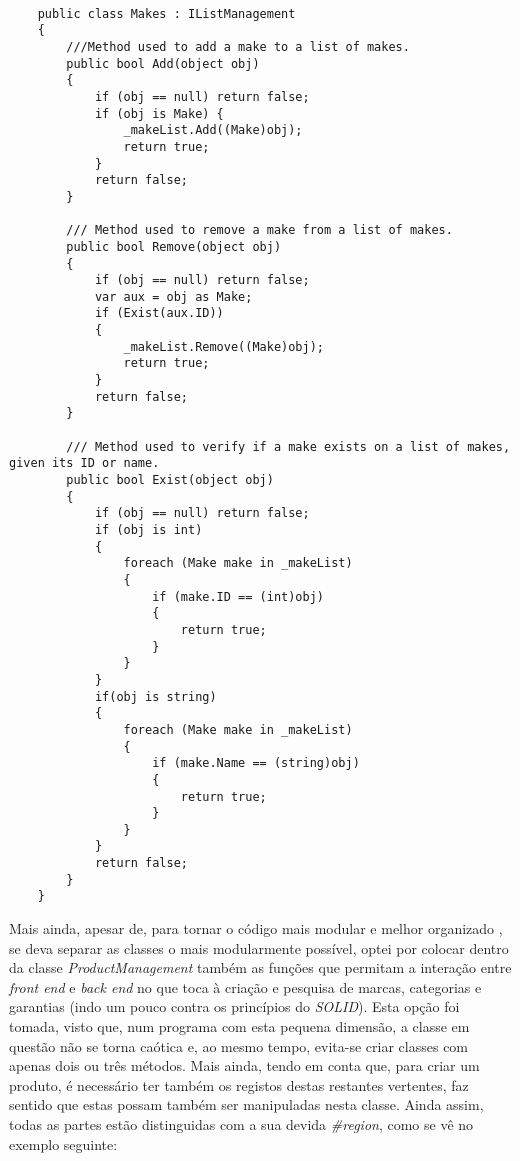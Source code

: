 \documentclass[11pt]{scrartcl} %
\begin{document}
\begin{lstlisting}[language={[Sharp]C}, caption={Outra Implementação do Interface}, label={Outra Implementação do Interface}]
	
	public class Makes : IListManagement
	{
		///Method used to add a make to a list of makes. 
		public bool Add(object obj)
		{
			if (obj == null) return false;
			if (obj is Make) {
				_makeList.Add((Make)obj);
				return true;
			}
			return false;
		}

		/// Method used to remove a make from a list of makes.
		public bool Remove(object obj)
		{
			if (obj == null) return false;
			var aux = obj as Make;
			if (Exist(aux.ID))
			{
				_makeList.Remove((Make)obj);
				return true;
			}
			return false;
		}
		
		/// Method used to verify if a make exists on a list of makes, given its ID or name.
		public bool Exist(object obj)
		{
			if (obj == null) return false;
			if (obj is int)
			{
				foreach (Make make in _makeList)
				{
					if (make.ID == (int)obj)
					{
						return true;
					}
				}
			}
			if(obj is string)
			{
				foreach (Make make in _makeList)
				{
					if (make.Name == (string)obj)
					{
						return true;
					}
				}
			}
			return false;
		}
	}
\end{lstlisting}

\vspace{20px}
Mais ainda, apesar de, para tornar o código mais modular e melhor organizado , se deva separar as classes o mais modularmente possível, optei por colocar dentro da classe \textit{ProductManagement} também as funções que permitam a interação entre \textit{front end} e \textit{back end} no que toca à criação e pesquisa de marcas, categorias e garantias (indo um pouco contra os princípios do \textit{SOLID}). Esta opção foi tomada, visto que, num programa com esta pequena dimensão, a classe em questão não se torna caótica e, ao mesmo tempo, evita-se criar classes com apenas dois ou três métodos. Mais ainda, tendo em conta que, para criar um produto, é necessário ter também os registos destas restantes vertentes, faz sentido que estas possam também ser manipuladas nesta classe. Ainda assim, todas as partes estão distinguidas com a sua devida \textit{\#region}, como se vê no exemplo seguinte:
\end{document}
